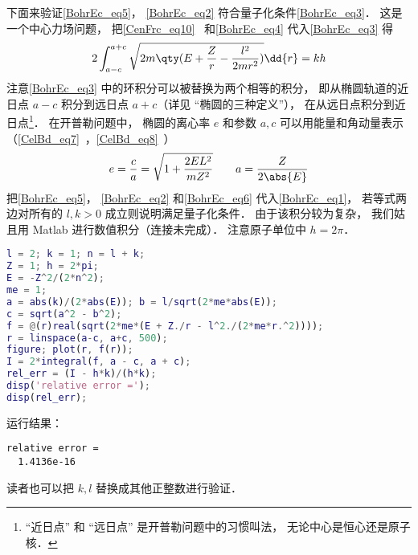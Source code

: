 下面来验证\autoref{BohrEc_eq5}， \autoref{BohrEc_eq2} 符合量子化条件\autoref{BohrEc_eq3}． 这是一个中心力场问题， 把\autoref{CenFrc_eq10}~ 和\autoref{BohrEc_eq4}  代入\autoref{BohrEc_eq3} 得
\begin{equation}\label{BohrEc_eq1}
2\int_{a-c}^{a+c} \sqrt{2m\qty(E + \frac{Z}{r} - \frac{l^2}{2mr^2})} \dd{r} = kh
\end{equation}
注意\autoref{BohrEc_eq3} 中的环积分可以被替换为两个相等的积分， 即从椭圆轨道的近日点 $a-c$ 积分到远日点 $a+c$（详见 “椭圆的三种定义”）， 在从远日点积分到近日点\footnote{“近日点” 和 “远日点” 是开普勒问题中的习惯叫法， 无论中心是恒心还是原子核．}． 在开普勒问题中， 椭圆的离心率 $e$ 和参数 $a, c$ 可以用能量和角动量表示（\autoref{CelBd_eq7}~，\autoref{CelBd_eq8}~）
\begin{equation}\label{BohrEc_eq6}
e = \frac{c}{a} = \sqrt{1 + \frac{2EL^2}{mZ^2}}
\qquad
a = \frac{Z}{2\abs{E}}
\end{equation}
把\autoref{BohrEc_eq5}， \autoref{BohrEc_eq2} 和\autoref{BohrEc_eq6} 代入\autoref{BohrEc_eq1}， 若等式两边对所有的 $l,k > 0$ 成立则说明满足量子化条件． 由于该积分较为复杂， 我们姑且用 Matlab 进行数值积分（连接未完成）． 注意原子单位中 $h = 2\pi$．
\begin{lstlisting}[language=matlab]
l = 2; k = 1; n = l + k;
Z = 1; h = 2*pi;
E = -Z^2/(2*n^2);
me = 1;
a = abs(k)/(2*abs(E)); b = l/sqrt(2*me*abs(E));
c = sqrt(a^2 - b^2);
f = @(r)real(sqrt(2*me*(E + Z./r - l^2./(2*me*r.^2))));
r = linspace(a-c, a+c, 500);
figure; plot(r, f(r));
I = 2*integral(f, a - c, a + c);
rel_err = (I - h*k)/(h*k);
disp('relative error =');
disp(rel_err);
\end{lstlisting}
运行结果： 
\begin{lstlisting}[language=matlabC]
relative error =
  1.4136e-16
\end{lstlisting}
读者也可以把 $k, l$ 替换成其他正整数进行验证．
